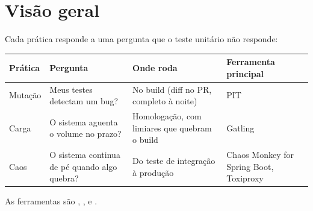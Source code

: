 \section{Visão geral}

Cada prática responde a uma pergunta que o teste unitário não responde:

\begin{center}
\small
\begin{tabular}{@{}l p{3.2cm} p{3.4cm} p{3.2cm}@{}}
\toprule
Prática & Pergunta & Onde roda & Ferramenta principal \\
\midrule
Mutação & Meus testes detectam um bug? & No build (diff no PR, completo à
noite) & PIT \\
Carga & O sistema aguenta o volume no prazo? & Homologação, com limiares
que quebram o build & Gatling \\
Caos & O sistema continua de pé quando algo quebra? & Do teste de integração
à produção & Chaos Monkey for Spring Boot, Toxiproxy \\
\bottomrule
\end{tabular}
\end{center}

As ferramentas são , ,
 e .
